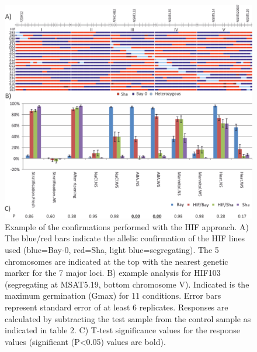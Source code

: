 \begin{figure}[h!]
  \centering
  \includegraphics[keepaspectratio,scale=0.30]{eps/image_3_1_8.eps}
  \caption[QTL confirmation.]{Example of the confirmations performed with the HIF approach. A) The blue/red bars 
          indicate the allelic confirmation of the HIF lines used (blue=Bay-0, red=Sha, light blue=segregating). 
          The 5 chromosomes are indicated at the top with the nearest genetic marker for the 7 major loci. B) example 
          analysis for HIF103 (segregating at MSAT5.19, bottom chromosome V). Indicated is the maximum germination 
          (Gmax) for 11 conditions. Error bars represent standard error of at least 6 replicates. Responses are 
          calculated by subtracting the test sample from the control sample as indicated in table 2. C) T-test 
          significance values for the response values (significant (P<0.05) values are bold).}
          \label{fig:confirmation}
\end{figure}

